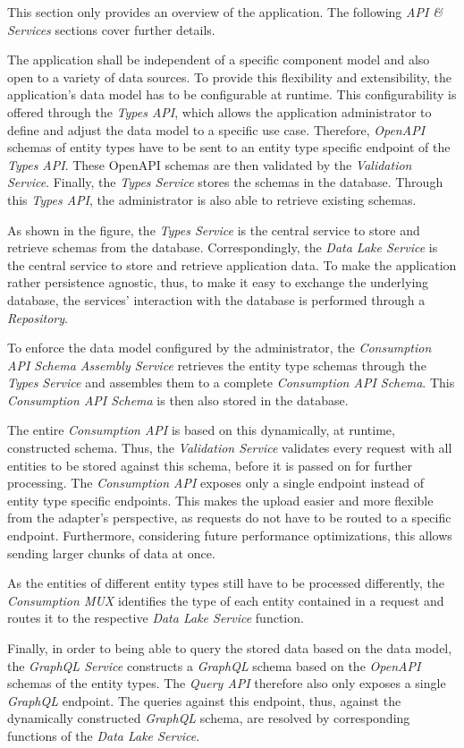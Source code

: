 This section only provides an overview of the application. The following \emph{API \& Services} sections cover further details.\par
The application shall be independent of a specific component model and also open to a variety of data sources. To provide this flexibility and extensibility, the application's data model has to be configurable at runtime. This configurability is offered through the \emph{Types API}, which allows the application administrator to define and adjust the data model to a specific use case. Therefore, \emph{OpenAPI} schemas of entity types have to be sent to an entity type specific endpoint of the \emph{Types API}. These OpenAPI schemas are then validated by the \emph{Validation Service}. Finally, the \emph{Types Service} stores the schemas in the database. Through this \emph{Types API}, the administrator is also able to retrieve existing schemas.\par
As shown in the figure, the \emph{Types Service} is the central service to store and retrieve schemas from the database. Correspondingly, the \emph{Data Lake Service} is the central service to store and retrieve application data. To make the application rather persistence agnostic, thus, to make it easy to exchange the underlying database, the services' interaction with the database is performed through a \emph{Repository}.\par 
To enforce the data model configured by the administrator, the \emph{Consumption API Schema Assembly Service} retrieves the entity type schemas through the \emph{Types Service} and assembles them to a complete \emph{Consumption API Schema}. This \emph{Consumption API Schema} is then also stored in the database.\par
The entire \emph{Consumption API} is based on this dynamically, at runtime, constructed schema. Thus, the \emph{Validation Service} validates every request with all entities to be stored against this schema, before it is passed on for further processing. The \emph{Consumption API} exposes only a single endpoint instead of entity type specific endpoints. This makes the upload easier and more flexible from the adapter's perspective, as requests do not have to be routed to a specific endpoint. Furthermore, considering future performance optimizations, this allows sending larger chunks of data at once.\par
As the entities of different entity types still have to be processed differently, the \emph{Consumption MUX} %
identifies the type of each entity contained in a request and routes it to the respective \emph{Data Lake Service} function.\par 
Finally, in order to being able to query the stored data based on the data model, the \emph{GraphQL Service} constructs a \emph{GraphQL} schema based on the \emph{OpenAPI} schemas of the entity types. The \emph{Query API} therefore also only exposes a single \emph{GraphQL} endpoint. The queries against this endpoint, thus, against the dynamically constructed \emph{GraphQL} schema, are resolved by corresponding functions of the \emph{Data Lake Service}.\\


